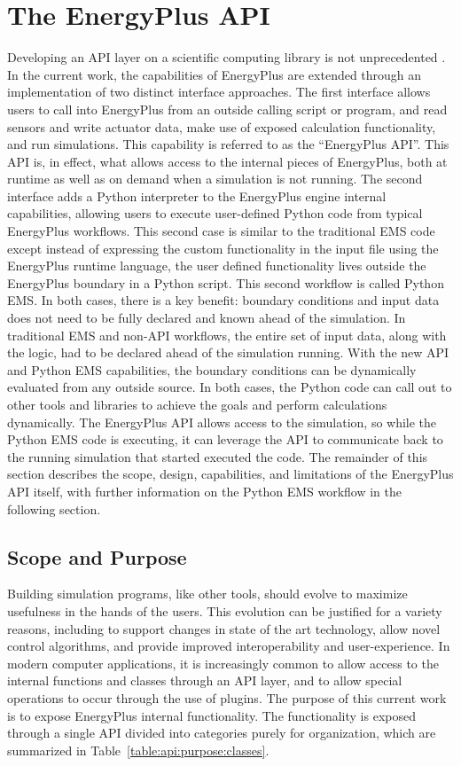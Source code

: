 \documentclass[5p, authoryear]{elsarticle}
\begin{document}
\section{The EnergyPlus API} 
Developing an API layer on a scientific computing library is not unprecedented \citep{Mohanan2018, Gratiy2018, Lotz2020}.
In the current work, the capabilities of EnergyPlus are extended through an implementation of two distinct interface approaches.
The first interface allows users to call into EnergyPlus from an outside calling script or program, and read sensors and write actuator data, make use of exposed calculation functionality, and run simulations.
This capability is referred to as the ``EnergyPlus API''.
This API is, in effect, what allows access to the internal pieces of EnergyPlus, both at runtime as well as on demand when a simulation is not running.
The second interface adds a Python interpreter to the EnergyPlus engine internal capabilities, allowing users to execute user-defined Python code from typical EnergyPlus workflows.  
This second case is similar to the traditional EMS code except instead of expressing the custom functionality in the input file using the EnergyPlus runtime language, the user defined functionality lives outside the EnergyPlus boundary in a Python script.
This second workflow is called Python EMS.
In both cases, there is a key benefit: boundary conditions and input data does not need to be fully declared and known ahead of the simulation.
In traditional EMS and non-API workflows, the entire set of input data, along with the logic, had to be declared ahead of the simulation running.
With the new API and Python EMS capabilities, the boundary conditions can be dynamically evaluated from any outside source.
In both cases, the Python code can call out to other tools and libraries to achieve the goals and perform calculations dynamically.
The EnergyPlus API allows access to the simulation, so while the Python EMS code is executing, it can leverage the API to communicate back to the running simulation that started executed the code.
The remainder of this section describes the scope, design, capabilities, and limitations of the EnergyPlus API itself, with further information on the Python EMS workflow in the following section.
 
\subsection{Scope and Purpose}
Building simulation programs, like other tools, should evolve to maximize usefulness in the hands of the users.
This evolution can be justified for a variety reasons, including to support changes in state of the art technology, allow novel control algorithms, and provide improved interoperability and user-experience.
In modern computer applications, it is increasingly common to allow access to the internal functions and classes through an API layer, and to allow special operations to occur through the use of plugins.
The purpose of this current work is to expose EnergyPlus internal functionality.
The functionality is exposed through a single API divided into categories purely for organization, which are summarized in Table~\ref{table:api:purpose:classes}.
\end{document}
